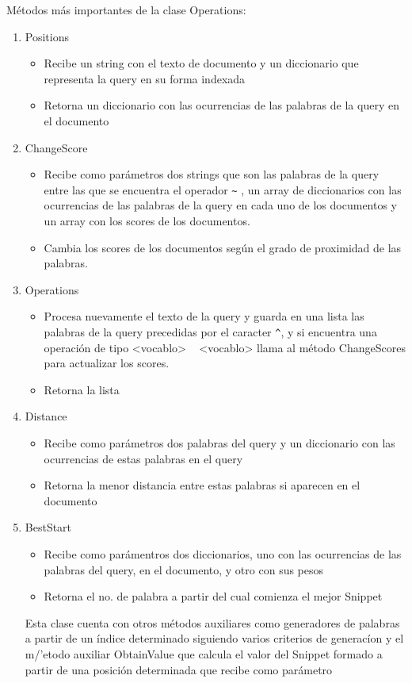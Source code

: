 \documentclass[12pt]{article}
\begin{document}
   M\'etodos m\'as importantes de la clase Operations:
   \begin{enumerate}
   	\item Positions
   	\begin{itemize}
   		\item Recibe un string con el texto de documento y un diccionario que representa la query en su forma indexada
   		\item Retorna un diccionario con las ocurrencias de las palabras de la query en el documento
   	\end{itemize}
   \item ChangeScore
   \begin{itemize}
   	\item Recibe como par\'ametros dos strings que son las palabras de la query entre las que se encuentra el operador \verb|~| , un array de diccionarios con las ocurrencias de las palabras de la query en cada uno de los documentos y un array con los scores de los documentos. 
   	\item Cambia los scores de los documentos seg\'un el grado de proximidad de las palabras.
   \end{itemize}
   \item Operations
   \begin{itemize}
   	\item Procesa nuevamente el texto de la query y guarda en una lista las palabras de la query precedidas por el caracter \verb|^|, y si encuentra una operaci\'on de tipo <vocablo> ~ <vocablo> llama al m\'etodo ChangeScores para actualizar los scores.
   	\item Retorna la lista 
   \end{itemize}
  \item Distance 
  \begin{itemize} 
  	\item Recibe como par\'ametros dos palabras del query y un diccionario con las ocurrencias de estas palabras en el query
  	\item Retorna la menor distancia entre estas palabras si aparecen en el documento
  \end{itemize}
  \item BestStart
  \begin{itemize}
  	\item Recibe como par\'amentros dos diccionarios, uno con las ocurrencias de las palabras del query, en el documento, y otro con sus pesos
  	\item Retorna el no. de palabra a partir del cual comienza el mejor Snippet  
  \end{itemize}

   Esta clase cuenta con otros m\'etodos auxiliares como generadores de palabras a partir de un \'indice determinado siguiendo varios criterios de generac\'ion y el m/'etodo auxiliar ObtainValue que calcula el valor del Snippet formado a partir de una posici\'on determinada que recibe como par\'ametro
   
   \end{enumerate}
\end{document}
